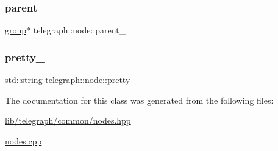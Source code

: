 \mbox{\label{classtelegraph_1_1node_a875057ad03af20786456cffe6d5b22d9}} 
\subsubsection{\texorpdfstring{parent\+\_\+}{parent\_}}
{\footnotesize\ttfamily \hyperlink{classtelegraph_1_1group}{group}$\ast$ telegraph\+::node\+::parent\+\_\+\hspace{0.3cm}{\ttfamily [protected]}}

\mbox{\label{classtelegraph_1_1node_a6d308459f7de904b54a1a551b3be5cb7}} 
\subsubsection{\texorpdfstring{pretty\+\_\+}{pretty\_}}
{\footnotesize\ttfamily std\+::string telegraph\+::node\+::pretty\+\_\+\hspace{0.3cm}{\ttfamily [protected]}}



The documentation for this class was generated from the following files\+:\begin{DoxyCompactItemize}
\item 
\hyperlink{lib_2telegraph_2common_2nodes_8hpp}{lib/telegraph/common/nodes.\+hpp}\item 
\hyperlink{nodes_8cpp}{nodes.\+cpp}\end{DoxyCompactItemize}
